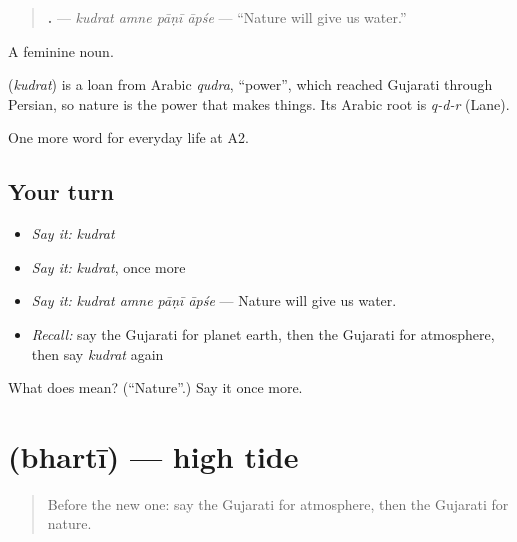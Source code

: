 \begin{quote}
\textbf{   .} — \emph{kudrat amne pāṇī āpśe} — \textquotedblleft{}Nature will give us water.\textquotedblright{}
\end{quote}

A feminine noun.

\begin{cousinweb}
\textbf{} (\emph{kudrat}) is a loan from Arabic \emph{qudra}, \textquotedblleft{}power\textquotedblright{}, which reached Gujarati through Persian, so nature is the power that makes things. Its Arabic root is \emph{q-d-r} (Lane).
\end{cousinweb}

\begin{grammarlens}[title={What you've built}]
One more word for everyday life at A2.
\end{grammarlens}

\subsection*{Your turn}
\begin{itemize}
\raggedright
  \item \emph{Say it:} \emph{kudrat}
  \item \emph{Say it:} \emph{kudrat}, once more
  \item \emph{Say it:} \emph{kudrat amne pāṇī āpśe} — Nature will give us water.
  \item \emph{Recall:} say the Gujarati for planet earth, then the Gujarati for atmosphere, then say \emph{kudrat} again
\end{itemize}

\begin{tcolorbox}[breakable,colback=teal!4,colframe=teal!35!black,title={Before you move on}]
What does  mean? (\textquotedblleft{}Nature\textquotedblright{}.) Say it once more.
\end{tcolorbox}
\section[\texorpdfstring{\gu{ભરતી} (bhartī)}{ભરતી (bhartī)}]{ (bhartī) — high tide}

\label{lesson:GU-C222-bharti}



\begin{quote}
Before the new one: say the Gujarati for atmosphere, then the Gujarati for nature.
\end{quote}

